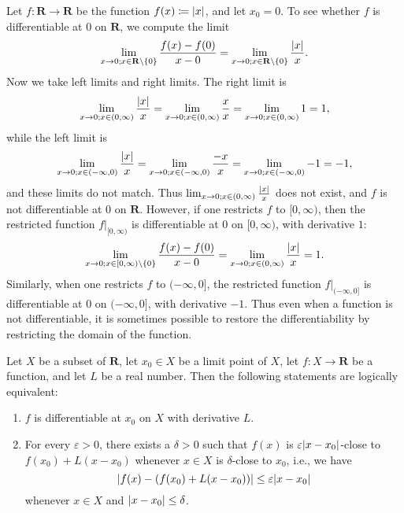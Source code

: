 \begin{example}\label{10.1.6}
    Let \(f : \mathbf{R} \to \mathbf{R}\) be the function \(f(x) \coloneqq \abs*{x}\), and let \(x_0 = 0\).
    To see whether \(f\) is differentiable at \(0\) on \(\mathbf{R}\), we compute the limit
    \[
        \lim_{x \to 0 ; x \in \mathbf{R} \setminus \{0\}} \frac{f(x) - f(0)}{x - 0} = \lim_{x \to 0 ; x \in \mathbf{R} \setminus \{0\}} \frac{\abs*{x}}{x}.
    \]
    Now we take left limits and right limits.
    The right limit is
    \[
        \lim_{x \to 0 ; x \in (0, \infty)} \frac{\abs*{x}}{x} = \lim_{x \to 0 ; x \in (0, \infty)} \frac{x}{x} = \lim_{x \to 0 ; x \in (0, \infty)} 1 = 1,
    \]
    while the left limit is
    \[
        \lim_{x \to 0 ; x \in (-\infty, 0)} \frac{\abs*{x}}{x} = \lim_{x \to 0 ; x \in (-\infty, 0)} \frac{-x}{x} = \lim_{x \to 0 ; x \in (-\infty, 0)} -1 = -1,
    \]
    and these limits do not match.
    Thus \(\lim_{x \to 0 ; x \in (0, \infty)} \frac{\abs*{x}}{x}\) does not exist, and \(f\) is not differentiable at \(0\) on \(\mathbf{R}\).
    However, if one restricts \(f\) to \([0, \infty)\), then the restricted function \(f|_{[0, \infty)}\) is differentiable at \(0\) on \([0, \infty)\), with derivative \(1\):
    \[
    \lim_{x \to 0 ; x \in [0, \infty) \setminus \{0\}} \frac{f(x) - f(0)}{x - 0} = \lim_{x \to 0 ; x \in (0, \infty)} \frac{\abs*{x}}{x} = 1.
        \]
        Similarly, when one restricts \(f\) to \((-\infty, 0]\), the restricted function \(f|_{(-\infty, 0]}\) is differentiable at \(0\) on \((-\infty, 0]\), with derivative \(-1\).
    Thus even when a function is not differentiable, it is sometimes possible to restore the differentiability by restricting the domain of the function.
\end{example}

\begin{proposition}\label{10.1.7}
    Let \(X\) be a subset of \(\mathbf{R}\), let \(x_0 \in X\) be a limit point of \(X\), let \(f : X \to \mathbf{R}\) be a function, and let \(L\) be a real number.
    Then the following statements are logically equivalent:
    \begin{enumerate}
        \item \(f\) is differentiable at \(x_0\) on \(X\) with derivative \(L\).
        \item For every \(\varepsilon > 0\), there exists a \(\delta > 0\) such that \(f(x)\) is \(\varepsilon \abs*{x - x_0}\)-close to \(f(x_0) + L(x - x_0)\) whenever \(x \in X\) is \(\delta\)-close to \(x_0\), i.e., we have
              \[
                  \abs*{f(x) - (f(x_0) + L(x - x_0))} \leq \varepsilon \abs*{x - x_0}
              \]
              whenever \(x \in X\) and \(\abs*{x - x_0} \leq \delta\).
    \end{enumerate}
\end{proposition}

